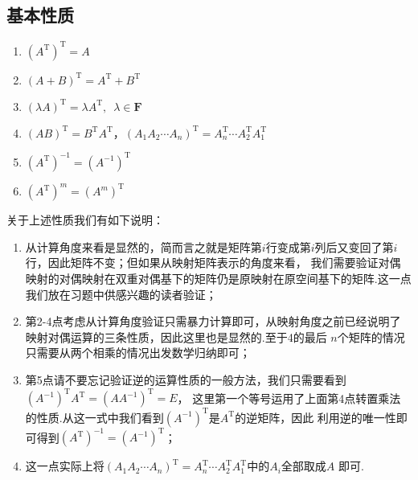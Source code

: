 \subsection{基本性质}
\begin{enumerate}
    \item $(A^\mathrm{T})^\mathrm{T}=A$

    \item $(A+B)^\mathrm{T}=A^\mathrm{T}+B^\mathrm{T}$

    \item $(\lambda A)^\mathrm{T}=\lambda A^\mathrm{T},\enspace \lambda \in \mathbf{F}$

    \item $(AB)^\mathrm{T}=B^\mathrm{T}A^\mathrm{T}$，$(A_1A_2\cdots A_n)^\mathrm{T}=A_n^\mathrm{T}\cdots A_2^\mathrm{T}A_1^\mathrm{T}$

    \item $(A^\mathrm{T})^{-1}=(A^{-1})^\mathrm{T}$

    \item $(A^\mathrm{T})^m=(A^m)^\mathrm{T}$
\end{enumerate}
关于上述性质我们有如下说明：
\begin{enumerate}
    \item 从计算角度来看是显然的，简而言之就是矩阵第$i$行变成第$i$列后又变回了第$i$行，因此矩阵不变；但如果从映射矩阵表示的角度来看，
    我们需要验证对偶映射的对偶映射在双重对偶基下的矩阵仍是原映射在原空间基下的矩阵.这一点我们放在习题中供感兴趣的读者验证；
    \item 第2-4点考虑从计算角度验证只需暴力计算即可，从映射角度之前已经说明了映射对偶运算的三条性质，因此这里也是显然的.至于4的最后
    $n$个矩阵的情况只需要从两个相乘的情况出发数学归纳即可；
    \item 第5点请不要忘记验证逆的运算性质的一般方法，我们只需要看到$(A^{-1})^\mathrm{T}A^\mathrm{T}=(AA^{-1})^\mathrm{T}=E$，
    这里第一个等号运用了上面第4点转置乘法的性质.从这一式中我们看到$(A^{-1})^\mathrm{T}$是$A^\mathrm{T}$的逆矩阵，因此
    利用逆的唯一性即可得到$(A^\mathrm{T})^{-1}=(A^{-1})^\mathrm{T}$；
    \item 这一点实际上将$(A_1A_2\cdots A_n)^\mathrm{T}=A_n^\mathrm{T}\cdots A_2^\mathrm{T}A_1^\mathrm{T}$中的$A_i$全部取成$A$
    即可.
\end{enumerate}

